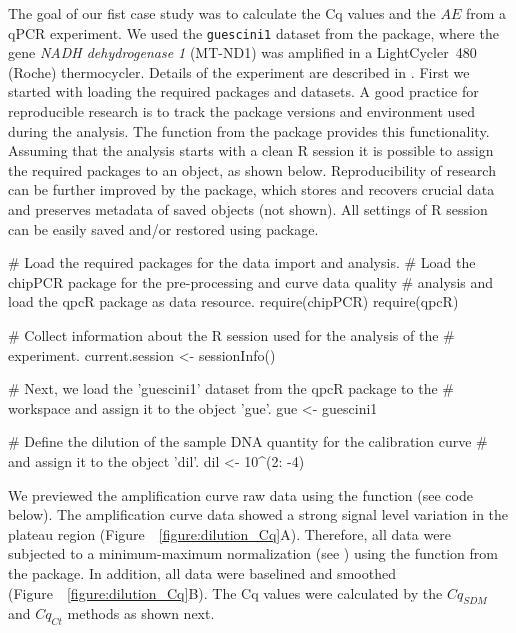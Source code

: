 The goal of our fist case study was to calculate the Cq values and the $AE$ from 
a qPCR experiment. We used the \texttt{guescini1} dataset from the  
package, where the gene \textit{NADH dehydrogenase 1} (MT-ND1) was amplified in 
a LightCycler\circledR~480 (Roche) thermocycler. Details of the experiment are 
described in \citet{guescini_2008}. First we started with loading the required 
packages and datasets. A good practice for reproducible research is to track the 
package versions and environment used during the analysis. The function 
 from the  package provides this functionality. 
Assuming that the analysis starts with a clean R session it is possible to 
assign the required packages to an object, as shown below. Reproducibility 
of research can be further improved by the  package, which 
stores and recovers crucial data and preserves metadata of saved objects (not 
shown). All settings of R session can be easily saved and/or restored using 
 package.

\begin{example}
# Load the required packages for the data import and analysis.
# Load the chipPCR package for the pre-processing and curve data quality
# analysis and load the qpcR package as data resource.
require(chipPCR)
require(qpcR)

# Collect information about the R session used for the analysis of the
# experiment.
current.session <- sessionInfo()

# Next, we load the 'guescini1' dataset from the qpcR package to the
# workspace and assign it to the object 'gue'.
gue <- guescini1

# Define the dilution of the sample DNA quantity for the calibration curve 
# and assign it to the object 'dil'.
dil <- 10^(2: -4)
\end{example}

We previewed the amplification curve raw data using the  
function (see code below). The amplification curve data showed a strong signal 
level variation in the plateau region (Figure~~\ref{figure:dilution_Cq}A). 
Therefore, all data were subjected to a minimum-maximum normalization (see 
\citet{roediger_RJ_2013}) using the  function from the 
 package. In addition, all data were baselined and smoothed 
(Figure~~\ref{figure:dilution_Cq}B). The Cq values were calculated by the 
$Cq_{SDM}$ and $Cq_{Ct}$ methods as shown next.

